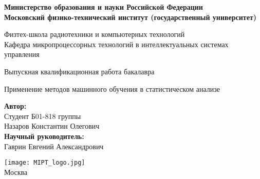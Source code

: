 \begin{center}
    \large\textbf{Министерство образования и науки Российской Федерации \\
        Московский физико-технический институт (государственный
        университет)} \\
    \vspace{1cm}

    Физтех-школа радиотехники и компьютерных технологий \\

    Кафедра микропроцессорных технологий в интеллектуальных системах управления \\

    \vspace{3em}

    Выпускная квалификационная работа бакалавра
\end{center}

\begin{center}
    \vspace{\fill}
    \LARGE{Применение методов машинного обучения в статистическом анализе}

    \vspace{\fill}
\end{center}


\begin{flushright}
    \textbf{Автор:} \\
    Студент Б01-818 группы \\
    Назаров Константин Олегович \\
    \vspace{2em}
    \textbf{Научный руководитель:} \\
    Гаврин Евгений Александрович  \\
\end{flushright}

\vspace{7em}

\begin{center}
    \texttt{[image: MIPT\_logo.jpg]}\\
    Москва \the\year{}
\end{center}

\thispagestyle{empty}

\newpage
\setcounter{page}{2}
\fancyfoot[c]{\thepage}
\fancyhead[R]{}